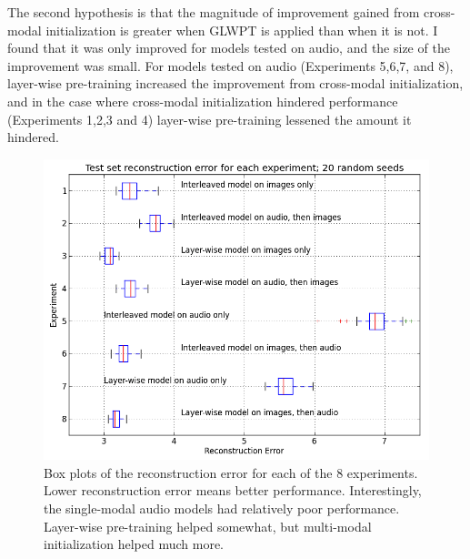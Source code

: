 \documentclass[12pt]{article}
\begin{document}
\begin{doublespacing}
The second hypothesis is that the magnitude of improvement gained from cross-modal initialization is greater when GLWPT is applied than when it is not. I found that it was only improved for models tested on audio, and the size of the improvement was small. For models tested on audio (Experiments 5,6,7, and 8), layer-wise pre-training increased the improvement from cross-modal initialization, and in the case where cross-modal initialization hindered performance (Experiments 1,2,3 and 4) layer-wise pre-training lessened the amount it hindered.
	
\begin{figure}[p]
\centering
\includegraphics[width=6in]{boxplot}
\caption{Box plots of the reconstruction error for each of the 8 experiments. Lower reconstruction error means better performance. Interestingly, the single-modal audio models had relatively poor performance. Layer-wise pre-training helped somewhat, but multi-modal initialization helped much more.}
\label{fig:boxplots}
\end{figure}
	

\end{doublespacing}
\end{document}
